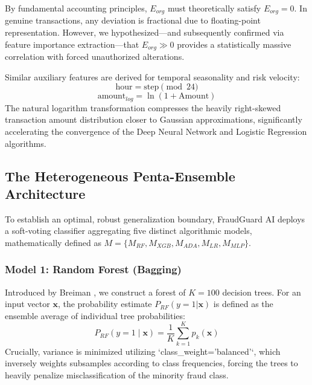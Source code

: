\documentclass[conference]{IEEEtran}
\begin{document}
By fundamental accounting principles, $E_{org}$ must theoretically satisfy $E_{org} = 0$. In genuine transactions, any deviation is fractional due to floating-point representation. However, we hypothesized—and subsequently confirmed via feature importance extraction—that $E_{org} \gg 0$ provides a statistically massive correlation with forced unauthorized alterations.

Similar auxiliary features are derived for temporal seasonality and risk velocity:
\begin{equation}
    \text{hour} = \text{step} \pmod{24}
\end{equation}
\begin{equation}
    \text{amount}_{log} = \ln(1 + \text{Amount})
\end{equation}
The natural logarithm transformation compresses the heavily right-skewed transaction amount distribution closer to Gaussian approximations, significantly accelerating the convergence of the Deep Neural Network and Logistic Regression algorithms.

\subsection{The Heterogeneous Penta-Ensemble Architecture}
To establish an optimal, robust generalization boundary, FraudGuard AI deploys a soft-voting classifier aggregating five distinct algorithmic models, mathematically defined as $M = \{M_{RF}, M_{XGB}, M_{ADA}, M_{LR}, M_{MLP}\}$.

\subsubsection{Model 1: Random Forest (Bagging)}
Introduced by Breiman \cite{breiman2001random}, we construct a forest of $K=100$ decision trees. For an input vector $\mathbf{x}$, the probability estimate $P_{RF}(y=1|\mathbf{x})$ is defined as the ensemble average of individual tree probabilities:
\begin{equation}
    P_{RF}(y=1 \mid \mathbf{x}) = \frac{1}{K} \sum_{k=1}^{K} p_k(\mathbf{x})
\end{equation}
Crucially, variance is minimized utilizing `class\_weight='balanced'`, which inversely weights subsamples according to class frequencies, forcing the trees to heavily penalize misclassification of the minority fraud class.
\end{document}
